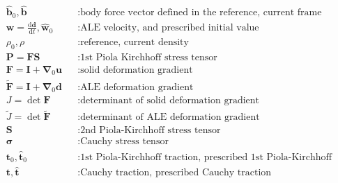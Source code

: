 \documentclass[a4paper,12pt]{report}
\newcommand{\bs}[1]{\boldsymbol{#1}}
\begin{document}
\begin{equation}
\begin{aligned}
&\hat{\bs{b}}_0, \hat{\bs{b}} &&: \text{body force vector defined in the reference, current frame} \\
&\bs{w}=\frac{\mathrm{d}\bs{d}}{\mathrm{d}t}, \hat{\bs{w}}_{0} &&: \text{ALE velocity, and prescribed initial value} \\
&\rho_0, \rho &&: \text{reference, current density} \\
&\bs{P}=\bs{F}\bs{S} &&: \text{1st Piola Kirchhoff stress tensor} \\
&\bs{F}=\bs{I}+\bs{\nabla}_{0}\bs{u} &&: \text{solid deformation gradient} \\
&\widetilde{\bs{F}}=\bs{I}+\bs{\nabla}_{0}\bs{d} &&: \text{ALE deformation gradient} \\
&J=\det \bs{F} &&: \text{determinant of solid deformation gradient} \\
&\widetilde{J}=\det \widetilde{\bs{F}} &&: \text{determinant of ALE deformation gradient} \\
&\bs{S} &&: \text{2nd Piola-Kirchhoff stress tensor} \\
&\bs{\sigma} &&: \text{Cauchy stress tensor} \\
&\bs{t}_0, \hat{\bs{t}}_{0} &&: \text{1st Piola-Kirchhoff traction, prescribed 1st Piola-Kirchhoff traction} \\
&\bs{t}, \hat{\bs{t}} &&: \text{Cauchy traction, prescribed Cauchy traction} \\
\end{aligned}
\end{equation}

\newpage

\end{document}
